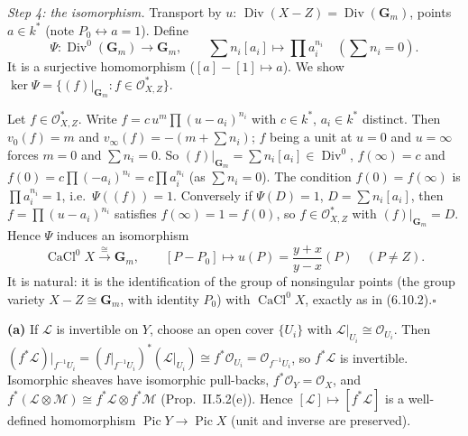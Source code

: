 \documentclass[11pt]{article}
\begin{document}
\emph{Step 4: the isomorphism.} Transport by $u$: $\operatorname{Div}(X-Z)=\operatorname{Div}(\mathbf G_m)$, points $a\in k^*$ (note $P_0\leftrightarrow a=1$). Define
\[
\Psi:\operatorname{Div}^0(\mathbf G_m)\to\mathbf G_m,\qquad\sum n_i[a_i]\mapsto\prod a_i^{n_i}\quad(\textstyle\sum n_i=0).
\]
It is a surjective homomorphism ($[a]-[1]\mapsto a$). We show $\ker\Psi=\{(f)|_{\mathbf G_m}:f\in\mathcal O_{X,Z}^*\}$. 

Let $f\in\mathcal O_{X,Z}^*$. Write $f=c\,u^m\prod(u-a_i)^{n_i}$ with $c\in k^*$, $a_i\in k^*$ distinct. Then $v_0(f)=m$ and $v_\infty(f)=-(m+\sum n_i)$; $f$ being a unit at $u=0$ and $u=\infty$ forces $m=0$ and $\sum n_i=0$. So $(f)|_{\mathbf G_m}=\sum n_i[a_i]\in\operatorname{Div}^0$, $f(\infty)=c$ and $f(0)=c\prod(-a_i)^{n_i}=c\prod a_i^{n_i}$ (as $\sum n_i=0$). The condition $f(0)=f(\infty)$ is $\prod a_i^{n_i}=1$, i.e.\ $\Psi((f))=1$. Conversely if $\Psi(D)=1$, $D=\sum n_i[a_i]$, then $f=\prod(u-a_i)^{n_i}$ satisfies $f(\infty)=1=f(0)$, so $f\in\mathcal O_{X,Z}^*$ with $(f)|_{\mathbf G_m}=D$. Hence $\Psi$ induces an isomorphism
\[
\operatorname{CaCl}^0X\xrightarrow{\ \cong\ }\mathbf G_m,\qquad[P-P_0]\mapsto u(P)=\frac{y+x}{y-x}(P)\quad(P\ne Z).
\]
It is natural: it is the identification of the group of nonsingular points (the group variety $X-Z\cong\mathbf G_m$, with identity $P_0$) with $\operatorname{CaCl}^0X$, exactly as in (6.10.2).\hfill$\square$

\pf
\textbf{(a)} If $\mathcal L$ is invertible on $Y$, choose an open cover $\{U_i\}$ with $\mathcal L|_{U_i}\cong\mathcal O_{U_i}$. Then $(f^*\mathcal L)|_{f^{-1}U_i}=(f|_{f^{-1}U_i})^*(\mathcal L|_{U_i})\cong f^*\mathcal O_{U_i}=\mathcal O_{f^{-1}U_i}$, so $f^*\mathcal L$ is invertible. Isomorphic sheaves have isomorphic pull-backs, $f^*\mathcal O_Y=\mathcal O_X$, and $f^*(\mathcal L\otimes\mathcal M)\cong f^*\mathcal L\otimes f^*\mathcal M$ (Prop.~II.5.2(e)). Hence $[\mathcal L]\mapsto[f^*\mathcal L]$ is a well-defined homomorphism $\operatorname{Pic}Y\to\operatorname{Pic}X$ (unit and inverse are preserved).
\end{document}
